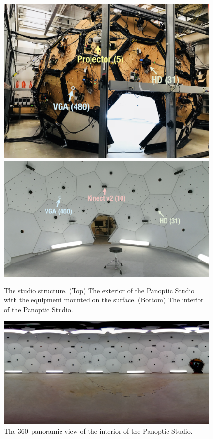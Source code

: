 	\begin{figure}
		\centering       
		\includegraphics[trim=0 0 0 0,clip,width=\linewidth]{fig_system/dome_exterior2_label}
		\includegraphics[trim=0 0 0 0,clip,width=\linewidth]{fig_system/panoptic_inside}	
		\caption{The studio structure. (Top) The exterior of the Panoptic Studio with the equipment mounted on the surface. (Bottom) The interior of the Panoptic Studio.} 
	\end{figure}

	
\begin{figure}
	\centering       
	\includegraphics[trim=0 0 0 0,clip,width=\linewidth]{fig_system/dome_pano}	
	\caption{The 360\degree~panoramic view of the interior of the Panoptic Studio.} 
\end{figure}




